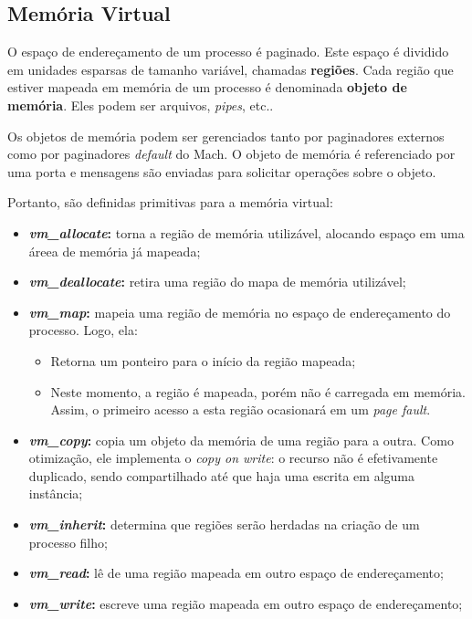 \subsection{Memória Virtual}
O espaço de endereçamento de um processo é paginado. Este espaço é dividido em unidades esparsas de tamanho variável, chamadas \textbf{regiões}. Cada região que estiver mapeada em memória de um processo é denominada \textbf{objeto de memória}. Eles podem ser arquivos, \textit{pipes}, etc..

Os objetos de memória podem ser gerenciados tanto por paginadores externos como por paginadores \textit{default} do Mach. O objeto de memória é referenciado por uma porta e mensagens são enviadas para solicitar operações sobre o objeto.

Portanto, são definidas primitivas para a memória virtual:
\begin{itemize}
  \item \textbf{\textit{vm\_allocate}:} torna a região de memória utilizável, alocando espaço em uma áreea de memória já mapeada;

  \item \textbf{\textit{vm\_deallocate}:} retira uma região do mapa de memória utilizável;

  \item \textbf{\textit{vm\_map}:} mapeia uma região de memória no espaço de endereçamento do processo. Logo, ela:
  \begin{itemize}
    \item Retorna um ponteiro para o início da região mapeada;

    \item Neste momento, a região é mapeada, porém não é carregada em memória. Assim, o primeiro acesso a esta região ocasionará em um \textit{page fault}.
  \end{itemize}

  \item \textbf{\textit{vm\_copy}:} copia um objeto da memória de uma região para a outra. Como otimização, ele implementa o \textit{copy on write}: o recurso não é efetivamente duplicado, sendo compartilhado até que haja uma escrita em alguma instância;

  \item \textbf{\textit{vm\_inherit}:} determina que regiões serão herdadas na criação de um processo filho;

  \item \textbf{\textit{vm\_read}:} lê de uma região mapeada em outro espaço de endereçamento;

  \item \textbf{\textit{vm\_write}:} escreve uma região mapeada em outro espaço de endereçamento;

\end{itemize}

